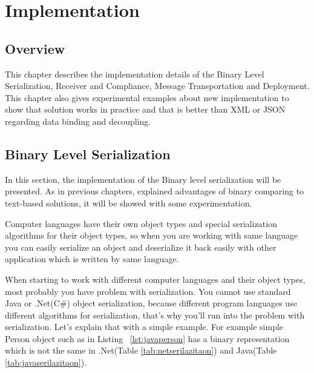 

\chapter{Implementation}
\label{chapter:implementation}

\section{Overview}
\label{section:overview}

This chapter describes the implementation details of the Binary Level Serialization, Receiver and Compliance, Message Transportation and Deployment. This chapter also gives experimental examples about new implementation to show that solution works in practice and that is better than XML or JSON regarding data binding and decoupling.

\section{Binary Level Serialization}
\label{section:binaryLevelSerialization}

In this section, the implementation of the Binary level serialization will be presented. As in previous chapters, explained advantages of binary comparing to text-based solutions, it will be showed with some experimentation.

Computer languages have their own object types and special serialization algorithms for their object types, so when you are working with same language you can easily serialize an object and deserialize it back easily with other application which is written by same language.

When starting to work with different computer languages and their object types, most probably you have problem with serialization. You cannot use standard Java or .Net(C\#) object serialization, because different program languages use different algorithms  for serialization, that's why you’ll run into the problem with serialization. Let's explain that with a simple example. For example simple Person object such as in Listing ~\ref{lst:javaperson} has a binary representation which is not the same in .Net(Table \ref{tab:netserilazitaon}) and Java(Table \ref{tab:javaserilazitaon}).\\

